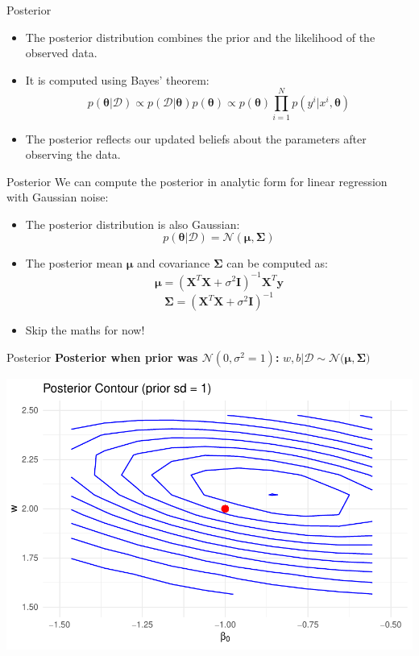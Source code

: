 \documentclass{beamer}
\begin{document}
\begin{frame}{Posterior}
  \begin{itemize}
  \item The posterior distribution combines the prior and the likelihood of the observed data.
  \item It is computed using Bayes' theorem:
    \[
      p(\bm{\theta} | \mathcal{D}) \propto p(\mathcal{D} | \bm{\theta}) p(\bm{\theta})
                                   \propto p(\bm{\theta}) \prod_{i=1}^{N} p(y^i | x^i, \bm{\theta})
  \]

  \item The posterior reflects our updated beliefs about the parameters after observing the data.
  \end{itemize}
\end{frame}

\begin{frame}{Posterior}
  We can compute the posterior in analytic form for linear regression with Gaussian noise:
  \begin{itemize}
  \item The posterior distribution is also Gaussian:
    \[
      p(\bm{\theta} | \mathcal{D}) = \mathcal{N}(\bm{\mu}, \bm{\Sigma})
    \]
  \item The posterior mean \(\bm{\mu}\) and covariance \(\bm{\Sigma}\) can be computed as:
    \[
      \bm{\mu} = (\bm{X}^T \bm{X} + \sigma^2 \bm{I})^{-1} \bm{X}^T \bm{y}
    \]
    \[
      \bm{\Sigma} = (\bm{X}^T \bm{X} + \sigma^2 \bm{I})^{-1}
    \]
  \item Skip the maths for now!
  \end{itemize}

\end{frame}

\begin{frame}{Posterior}
  \textbf{Posterior when prior was \(\mathcal{N}(0, \sigma^2=1)\):}
  \(
    w, b | \mathcal{D} \sim \mathcal{N}\big(\bm{\mu}, \bm{\Sigma}\big)
  \)

  \begin{center}
    \includegraphics[width=0.8\linewidth]{posterior_contour_1.pdf}
  \end{center}
\end{frame}
\end{document}
